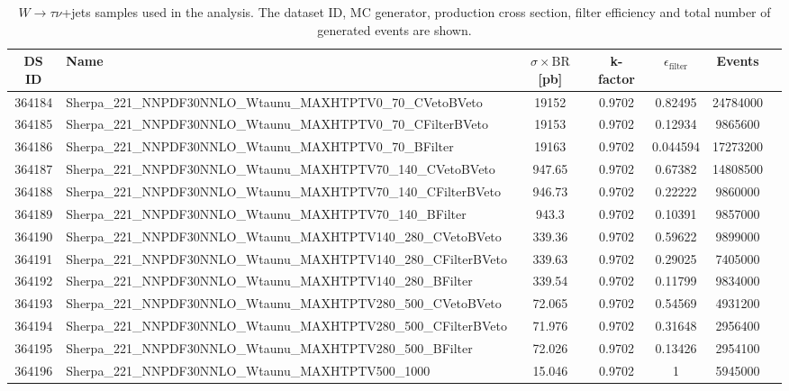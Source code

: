 \begin{landscape}
\begin{table}[!htb]
	\caption{$W \to \tau\nu$+jets samples used in the analysis. The dataset ID, MC generator, production cross section, filter efficiency and total number of generated events are shown.}
	\label{tabular:mc_samples_Wtaunujets}
	\begin{footnotesize}
		\begin{center}
			\begin{tabular}{|c|l|c|c|c|c|r|}
				\hline
				DS ID & Name & $\sigma\times\text{BR}$ [pb] & k-factor & $\epsilon_{\text{filter}}$ & Events \\ \hline
				364184 & Sherpa\_221\_NNPDF30NNLO\_Wtaunu\_MAXHTPTV0\_70\_CVetoBVeto & 19152 & 0.9702 & 0.82495 & 24784000 \\
				364185 & Sherpa\_221\_NNPDF30NNLO\_Wtaunu\_MAXHTPTV0\_70\_CFilterBVeto & 19153 & 0.9702 & 0.12934 & 9865600 \\
				364186 & Sherpa\_221\_NNPDF30NNLO\_Wtaunu\_MAXHTPTV0\_70\_BFilter & 19163 & 0.9702 & 0.044594 & 17273200 \\
				364187 & Sherpa\_221\_NNPDF30NNLO\_Wtaunu\_MAXHTPTV70\_140\_CVetoBVeto & 947.65 & 0.9702 & 0.67382 & 14808500 \\
				364188 & Sherpa\_221\_NNPDF30NNLO\_Wtaunu\_MAXHTPTV70\_140\_CFilterBVeto & 946.73 & 0.9702 & 0.22222 & 9860000 \\
				364189 & Sherpa\_221\_NNPDF30NNLO\_Wtaunu\_MAXHTPTV70\_140\_BFilter & 943.3 & 0.9702 & 0.10391 & 9857000 \\
				364190 & Sherpa\_221\_NNPDF30NNLO\_Wtaunu\_MAXHTPTV140\_280\_CVetoBVeto & 339.36 & 0.9702 & 0.59622 & 9899000 \\
				364191 & Sherpa\_221\_NNPDF30NNLO\_Wtaunu\_MAXHTPTV140\_280\_CFilterBVeto & 339.63 & 0.9702 & 0.29025 & 7405000 \\
				364192 & Sherpa\_221\_NNPDF30NNLO\_Wtaunu\_MAXHTPTV140\_280\_BFilter & 339.54 & 0.9702 & 0.11799 & 9834000 \\
				364193 & Sherpa\_221\_NNPDF30NNLO\_Wtaunu\_MAXHTPTV280\_500\_CVetoBVeto & 72.065 & 0.9702 & 0.54569 & 4931200 \\
				364194 & Sherpa\_221\_NNPDF30NNLO\_Wtaunu\_MAXHTPTV280\_500\_CFilterBVeto & 71.976 & 0.9702 & 0.31648 & 2956400 \\
				364195 & Sherpa\_221\_NNPDF30NNLO\_Wtaunu\_MAXHTPTV280\_500\_BFilter & 72.026 & 0.9702 & 0.13426 & 2954100 \\
				364196 & Sherpa\_221\_NNPDF30NNLO\_Wtaunu\_MAXHTPTV500\_1000 & 15.046 & 0.9702 & 1 & 5945000 \\
				\hline
			\end{tabular}
		\end{center}
	\end{footnotesize}
\end{table}


\end{landscape}
